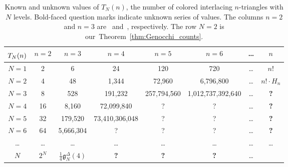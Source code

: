 \documentclass[pdftex]{sigma}
\numberwithin{equation}{section}
\theoremstyle{definition}
\begin{document}
\begin{table}[!ht]
	\centering \small
	\begin{tabular}{|c|c|c|c|c|c|c|c|}
\hline $T_N(n)\rule{0pt}{13pt}$ & $n=2$                 & $n=3$                                & $n=4$          & $n=5$       & $n=6$             & \dots & $n$           \\[2pt]
\hline $N=1$                    & 2                     & 6                                    & 24             & 120         & 720               & \dots & $n!$          \\ \hline $N=2$                    & 4                     & 48                                   & 1,344          & 72,960      & 6,796,800         & \dots &$n!\cdot H_n$ \\ \hline $N=3$                    & 8                     & 528                                  &191,232        & 257,794,560 & 1,012,737,392,640 & \dots &\textbf{?}             \\ \hline $N=4$                    & 16                    & 8,160                                & 72,099,840     & ?           & ?                 & \dots & \textbf{?}		\\ \hline $N=5$                    & 32                    & 179,520                              & 73,410,306,048 & ?           & ?                 & \dots & \textbf{?}             \\ \hline
		$N=6$            & 64                    & 5,666,304                            & ?              & ?           &?                 & \dots & \textbf{?}             \\ \hline \dots                   & \dots                & \dots                               & \dots         & \dots      & \dots            & \dots & \dots		\\ \hline $N$                      & $2^N$\rule{0pt}{12pt} &$\tfrac14\mathfrak{g}_N^{\Delta}(4)$ & \textbf{?}     &\textbf{?}  & \textbf{?}        & \dots &		\\[3pt] \hline
	\end{tabular}
	\caption{Known and unknown values of $T_N(n)$, the number of colored
	interlacing $n$-triangles with $N$ levels.
	Bold-faced question marks indicate unknown series of values.
	The columns $n=2$ and $n=3$ are~\cite{ABW2023coloured_LLT} and~\cite{gaetz2023bijection}, respectively.
	The row $N=2$ is our~Theorem~\ref{thm:Genocchi_counts}.}
	\label{tab:known_counts_of_colored_interlacing_triangles}
\end{table}
\end{document}
